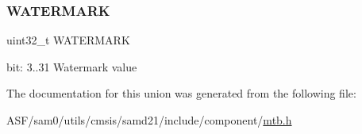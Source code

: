 \subsubsection{\texorpdfstring{WATERMARK}{WATERMARK}}
{\footnotesize\ttfamily uint32\+\_\+t W\+A\+T\+E\+R\+M\+A\+RK}

bit\+: 3..31 Watermark value 

The documentation for this union was generated from the following file\+:\begin{DoxyCompactItemize}
\item 
A\+S\+F/sam0/utils/cmsis/samd21/include/component/\mbox{\hyperlink{component_2mtb_8h}{mtb.\+h}}\end{DoxyCompactItemize}
